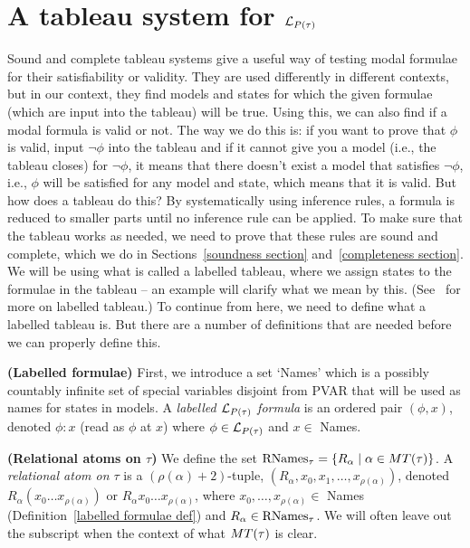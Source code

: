 \section{A tableau system for  \texorpdfstring{$\mathcal{L}_{P(\tau)}$}{Lp}}\label{pure tableau section}

\par Sound and complete tableau systems give a useful way of testing modal formulae for their satisfiability or validity. They are used differently in different contexts, but in our context, they find models and states for which the given formulae (which are input into the tableau) will be true. Using this, we can also find if a modal formula is valid or not. The way we do this is: if you want to prove that $\phi$ is valid, input $\neg\phi$ into the tableau and if it cannot give you a model (i.e., the tableau closes) for $\neg\phi$, it means that there doesn’t exist a model that satisfies $\neg\phi$, i.e., $\phi$ will be satisfied for any model and state, which means that it is valid. But how does a tableau do this? By systematically using inference rules, a formula is reduced to smaller parts until no inference rule can be applied. To make sure that the tableau works as needed, we need to prove that these rules are sound and complete, which we do in Sections~\ref{soundness section} and~\ref{completeness section}. We will be using what is called a labelled tableau, where we assign states to the formulae in the tableau – an example will clarify what we mean by this. (See~\cite{governatori2008labelled} for more on labelled tableau.) To continue from here, we need to define what a labelled tableau is. But there are a number of definitions that are needed before we can properly define this.



\begin{definition} \label{labelled formulae def}
    \textbf{(Labelled formulae)} First, we introduce a set `Names' which is a possibly countably infinite set of special variables disjoint from PVAR that will be used as names for states in models. A \textit{labelled $\mathcal{L}_{P(\tau)}$ formula} is an ordered pair $(\phi,x)$, denoted $\phi:x$ (read as $\phi$ at $x$) where $\phi\in\mathcal{L}_{P(\tau)}$ and $x \in$ Names. 
\end{definition}

\begin{definition} \label{relational atoms def}
   \textbf{(Relational atoms on $\tau$)} We define the set $\text{RNames}_\tau = \{R_\alpha\mid\alpha\in MT(\tau)\}$. A \textit{relational atom on $\tau$} is a $(\rho(\alpha)+2)$-tuple, $(R_\alpha,x_0,x_1,\ldots,x_{\rho(\alpha)})$, denoted $R_\alpha (x_0\ldots x_{\rho(\alpha)})$ or  $R_\alpha x_0\ldots x_{\rho(\alpha)}$, where $x_0,\ldots, x_{\rho(\alpha)} \in$ Names (Definition~\ref{labelled formulae def}) and $R_\alpha \in\text{RNames}_\tau$. We will often leave out the subscript when the context of what $MT(\tau)$ is clear.
\end{definition}

